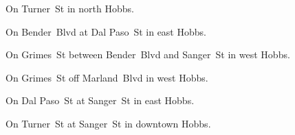 
\begin{LocationList}

On   Turner~St in north Hobbs.

\Location{\GasStation \Gas}
On  Bender~Blvd at  Dal Paso~St in east Hobbs.

On Grimes~St between Bender~Blvd and Sanger~St in west Hobbs.

On Grimes~St off   Marland~Blvd in west Hobbs.

On  Dal Paso~St at Sanger~St in east Hobbs.

On Turner~St at Sanger~St in downtown Hobbs.

\end{LocationList}
